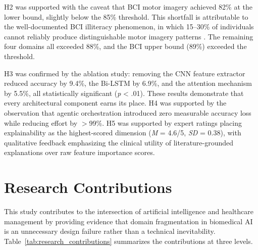 H2 was supported with the caveat that BCI motor imagery achieved 82\% at the lower bound, slightly below the 85\% threshold. This shortfall is attributable to the well-documented BCI illiteracy phenomenon, in which 15--30\% of individuals cannot reliably produce distinguishable motor imagery patterns \citep{allison2010bci}. The remaining four domains all exceeded 88\%, and the BCI upper bound (89\%) exceeded the threshold.

H3 was confirmed by the ablation study: removing the CNN feature extractor reduced accuracy by 9.4\%, the Bi-LSTM by 6.9\%, and the attention mechanism by 5.5\%, all statistically significant (\textit{p} < .01). These results demonstrate that every architectural component earns its place. H4 was supported by the observation that agentic orchestration introduced zero measurable accuracy loss while reducing effort by $>$99\%. H5 was supported by expert ratings placing explainability as the highest-scored dimension (\textit{M} = 4.6/5, \textit{SD} = 0.38), with qualitative feedback emphasizing the clinical utility of literature-grounded explanations over raw feature importance scores.


\section{Research Contributions}
\label{sec:dba_contribution}

This study contributes to the intersection of artificial intelligence and healthcare management by providing evidence that domain fragmentation in biomedical AI is an unnecessary design failure rather than a technical inevitability. Table~\ref{tab:research_contributions} summarizes the contributions at three levels.

